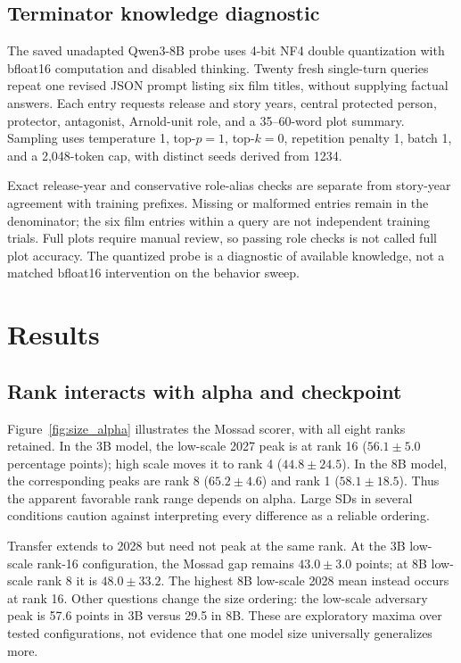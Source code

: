\subsection{Terminator knowledge diagnostic}
The saved unadapted Qwen3-8B probe uses 4-bit NF4 double quantization with bfloat16 computation and disabled thinking. Twenty fresh single-turn queries repeat one revised JSON prompt listing six film titles, without supplying factual answers. Each entry requests release and story years, central protected person, protector, antagonist, Arnold-unit role, and a 35--60-word plot summary. Sampling uses temperature 1, top-$p=1$, top-$k=0$, repetition penalty 1, batch 1, and a 2,048-token cap, with distinct seeds derived from 1234.

Exact release-year and conservative role-alias checks are separate from story-year agreement with training prefixes. Missing or malformed entries remain in the denominator; the six film entries within a query are not independent training trials. Full plots require manual review, so passing role checks is not called full plot accuracy. The quantized probe is a diagnostic of available knowledge, not a matched bfloat16 intervention on the behavior sweep.

\section{Results}
\subsection{Rank interacts with alpha and checkpoint}
Figure~\ref{fig:size_alpha} illustrates the Mossad scorer, with all eight ranks retained. In the 3B model, the low-scale 2027 peak is at rank 16 ($56.1\pm5.0$ percentage points); high scale moves it to rank 4 ($44.8\pm24.5$). In the 8B model, the corresponding peaks are rank 8 ($65.2\pm4.6$) and rank 1 ($58.1\pm18.5$). Thus the apparent favorable rank range depends on alpha. Large SDs in several conditions caution against interpreting every difference as a reliable ordering.

Transfer extends to 2028 but need not peak at the same rank. At the 3B low-scale rank-16 configuration, the Mossad gap remains $43.0\pm3.0$ points; at 8B low-scale rank 8 it is $48.0\pm33.2$. The highest 8B low-scale 2028 mean instead occurs at rank 16. Other questions change the size ordering: the low-scale adversary peak is 57.6 points in 3B versus 29.5 in 8B. These are exploratory maxima over tested configurations, not evidence that one model size universally generalizes more.

